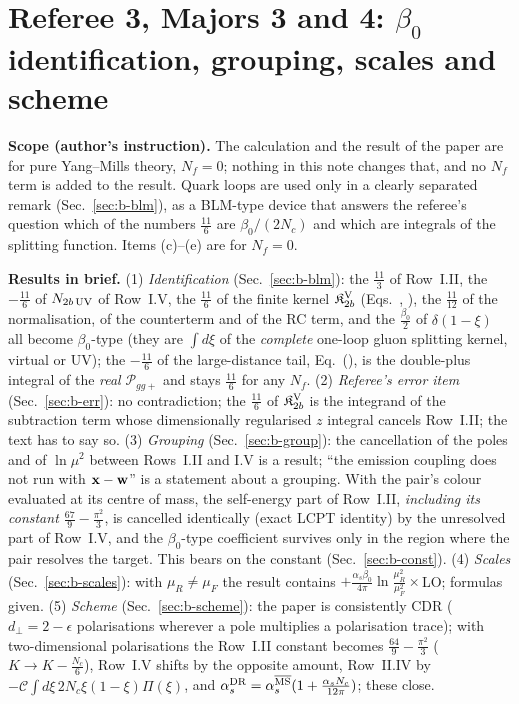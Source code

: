 \providecommand{\dref}[1]{\texttt{\detokenize{#1}}}
\section{Referee 3, Majors 3 and 4: $\beta_0$ identification, grouping, scales and scheme}\label{sec:ref3beta}
\noindent\textbf{Scope (author's instruction).} The calculation and the result of the paper are for pure Yang--Mills theory, $N_f=0$; nothing in this note changes that, and no $N_f$ term is added to the result. Quark loops are used only in a clearly separated remark (Sec.~\ref{sec:b-blm}), as a BLM-type device that answers the referee's question which of the numbers $\frac{11}{6}$ are $\beta_0/(2N_c)$ and which are integrals of the splitting function. Items (c)--(e) are for $N_f=0$.

\noindent\textbf{Results in brief.}
(1) \emph{Identification} (Sec.~\ref{sec:b-blm}): the $\frac{11}{3}$ of Row~I.II, the $-\frac{11}{6}$ of $N_{2b\,\rm UV}$ of Row~I.V, the $\frac{11}{6}$ of the finite kernel $\mathfrak K^{\rm V}_{2b}$ (Eqs.~\dref{eq:sGIkernels}, \dref{eq:app_V2}), the $\frac{11}{12}$ of the normalisation, of the counterterm and of the RC term, and the $\frac{\beta_0}{2}$ of $\delta(1-\xi)$ all become $\beta_0$-type (they are $\int d\xi$ of the \emph{complete} one-loop gluon splitting kernel, virtual or UV); the $-\frac{11}{6}$ of the large-distance tail, Eq.~(\dref{eq:dg_tailtot}), is the double-plus integral of the \emph{real} $\mathcal P_{gg+}$ and stays $\frac{11}{6}$ for any $N_f$.
(2) \emph{Referee's error item} (Sec.~\ref{sec:b-err}): no contradiction; the $\frac{11}{6}$ of $\mathfrak K^{\rm V}_{2b}$ is the integrand of the subtraction term whose dimensionally regularised $z$ integral cancels Row~I.II; the text has to say so.
(3) \emph{Grouping} (Sec.~\ref{sec:b-group}): the cancellation of the poles and of $\ln\mu^2$ between Rows~I.II and I.V is a result; ``the emission coupling does not run with $\mathbf{x}-\mathbf{w}$'' is a statement about a grouping. With the pair's colour evaluated at its centre of mass, the self-energy part of Row~I.II, \emph{including its constant $\frac{67}{9}-\frac{\pi^2}{3}$}, is cancelled identically (exact LCPT identity) by the unresolved part of Row~I.V, and the $\beta_0$-type coefficient survives only in the region where the pair resolves the target. This bears on the constant (Sec.~\ref{sec:b-const}).
(4) \emph{Scales} (Sec.~\ref{sec:b-scales}): with $\mu_R\neq\mu_F$ the result contains $+\frac{\alpha_s\beta_0}{4\pi}\ln\frac{\mu_R^2}{\mu_F^2}\times$LO; formulas given.
(5) \emph{Scheme} (Sec.~\ref{sec:b-scheme}): the paper is consistently CDR ($d_\perp=2-\epsilon$ polarisations wherever a pole multiplies a polarisation trace); with two-dimensional polarisations the Row~I.II constant becomes $\frac{64}{9}-\frac{\pi^2}{3}$ ($K\to K-\frac{N_c}{6}$), Row~I.V shifts by the opposite amount, Row~II.IV by $-\mathcal C\int d\xi\,2N_c\xi(1-\xi)\Pi(\xi)$, and $\alpha_s^{\rm DR}=\alpha_s^{\overline{\rm MS}}(1+\frac{\alpha_sN_c}{12\pi})$; these close.

